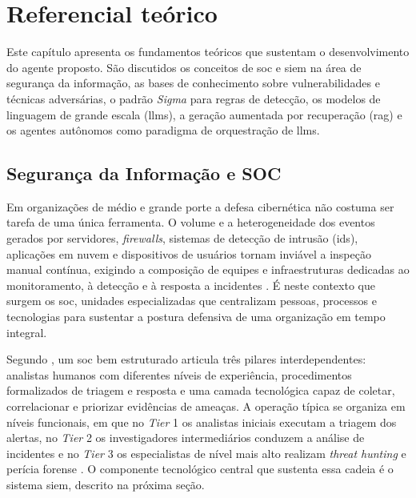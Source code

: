 \chapter{Referencial te\'orico}\label{cap:referencialTeorico}

Este capítulo apresenta os fundamentos teóricos que sustentam o desenvolvimento do agente proposto. 
São discutidos os conceitos de \gls{soc} e \gls{siem} na área de segurança da informação, as bases de conhecimento sobre vulnerabilidades e técnicas adversárias, o padrão \textit{Sigma} para regras de detecção, os modelos de linguagem de grande escala (\glspl{llm}), a geração aumentada por recuperação (\gls{rag}) e os agentes autônomos como paradigma de orquestração de \glspl{llm}.

\section{Segurança da Informação e SOC}

Em organizações de médio e grande porte a defesa cibernética não costuma ser tarefa de uma única ferramenta. 
O volume e a heterogeneidade dos eventos gerados por servidores, \textit{firewalls}, sistemas de detecção de intrusão (\gls{ids}), aplicações em nuvem e dispositivos de usuários tornam inviável a inspeção manual contínua, exigindo a composição de equipes e infraestruturas dedicadas ao monitoramento, à detecção e à resposta a incidentes \cite{vielberth2020soc, Shah2022}. É neste contexto que surgem os \gls{soc}, unidades especializadas que centralizam pessoas, processos e tecnologias para sustentar a postura defensiva de uma organização em tempo integral.

Segundo , um \gls{soc} bem estruturado articula três pilares interdependentes: analistas humanos com diferentes níveis de experiência, procedimentos formalizados de triagem e resposta e uma camada tecnológica capaz de coletar, correlacionar e priorizar evidências de ameaças. 
A operação típica se organiza em níveis funcionais, em que no \textit{Tier} 1 os analistas iniciais executam a triagem dos alertas, no \textit{Tier} 2 os investigadores intermediários conduzem a análise de incidentes e no \textit{Tier} 3 os especialistas de nível mais alto realizam \textit{\gls{threat hunting}} e perícia forense \cite{tariq2025alert}. 
O componente tecnológico central que sustenta essa cadeia é o sistema \gls{siem}, descrito na próxima seção. 

